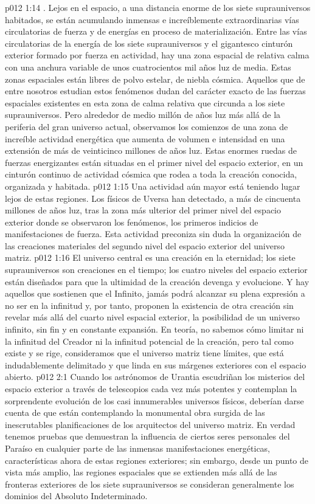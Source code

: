 \vs p012 1:14 . Lejos en el espacio, a una distancia enorme de los siete suprauniversos habitados, se están acumulando inmensas e increíblemente extraordinarias vías circulatorias de fuerza y de energías en proceso de materialización. Entre las vías circulatorias de la energía de los siete suprauniversos y el gigantesco cinturón exterior formado por fuerza en actividad, hay una zona espacial de relativa calma con una anchura variable de unos cuatrocientos mil años luz de media. Estas zonas espaciales están libres de polvo estelar, de niebla cósmica. Aquellos que de entre nosotros estudian estos fenómenos dudan del carácter exacto de las fuerzas espaciales existentes en esta zona de calma relativa que circunda a los siete suprauniversos. Pero alrededor de medio millón de años luz más allá de la periferia del gran universo actual, observamos los comienzos de una zona de increíble actividad energética que aumenta de volumen e intensidad en una extensión de más de veinticinco millones de años luz. Estas enormes ruedas de fuerzas energizantes están situadas en el primer nivel del espacio exterior, en un cinturón continuo de actividad cósmica que rodea a toda la creación conocida, organizada y habitada.
\vs p012 1:15 Una actividad aún mayor está teniendo lugar lejos de estas regiones. Los físicos de Uversa han detectado, a más de cincuenta millones de años luz, tras la zona más ulterior del primer nivel del espacio exterior donde se observaron los fenómenos, los primeros indicios de manifestaciones de fuerza. Esta actividad preconiza sin duda la organización de las creaciones materiales del segundo nivel del espacio exterior del universo matriz.
\vs p012 1:16 El universo central es una creación en la eternidad; los siete suprauniversos son creaciones en el tiempo; los cuatro niveles del espacio exterior están diseñados para que la ultimidad de la creación devenga y evolucione. Y hay aquellos que sostienen que el Infinito, jamás podrá alcanzar su plena expresión a no ser en la infinitud y, por tanto, proponen la existencia de otra creación sin revelar más allá del cuarto nivel espacial exterior, la posibilidad de un universo infinito, sin fin y en constante expansión. En teoría, no sabemos cómo limitar ni la infinitud del Creador ni la infinitud potencial de la creación, pero tal como existe y se rige, consideramos que el universo matriz tiene límites, que está indudablemente delimitado y que linda en sus márgenes exteriores con el espacio abierto.
\vs p012 2:1 Cuando los astrónomos de Urantia escudriñan los misterios del espacio exterior a través de telescopios cada vez más potentes y contemplan la sorprendente evolución de los casi innumerables universos físicos, deberían darse cuenta de que están contemplando la monumental obra surgida de las inescrutables planificaciones de los arquitectos del universo matriz. En verdad tenemos pruebas que demuestran la influencia de ciertos seres personales del Paraíso en cualquier parte de las inmensas manifestaciones energéticas, características ahora de estas regiones exteriores; sin embargo, desde un punto de vista más amplio, las regiones espaciales que se extienden más allá de las fronteras exteriores de los siete suprauniversos se consideran generalmente los dominios del Absoluto Indeterminado.
